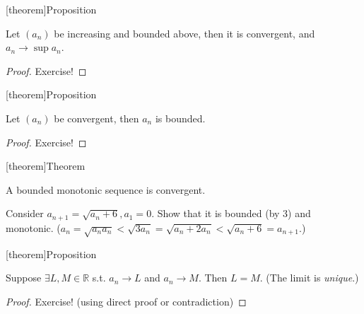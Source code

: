 \documentclass[12pt]{report}
\theoremstyle{definition}
\begin{document}
[theorem]{Proposition}
\begin{increasing and bounded above}
    Let $(a_n)$ be increasing and bounded above, then it is convergent,
    and $a_n \rightarrow{} \sup{a_n}$.
\end{increasing and bounded above}

\begin{proof}
    Exercise!
\end{proof}

[theorem]{Proposition}
\begin{convergent series is bounded}
    Let $(a_n)$ be convergent, then $a_n$ is bounded.
\end{convergent series is bounded}

\begin{proof}
    Exercise!
\end{proof}

[theorem]{Theorem}
\begin{bounded monotonic sequence is convergent}
    A bounded monotonic sequence is convergent.
\end{bounded monotonic sequence is convergent}

\begin{ex}
    Consider $a_{n + 1} = \sqrt{a_n + 6}, a_1 = 0$. 
    Show that it is bounded (by 3) and monotonic.
    ($a_n = \sqrt{a_n a_n} < \sqrt{3a_n} = \sqrt{a_n + 2a_n} < \sqrt{a_n + 6} = a_{n + 1}$.)
\end{ex}


[theorem]{Proposition}
\begin{limit of convergence is unique}
    Suppose $\exists L, M \in \mathbb{R}$ s.t. $a_n \rightarrow{}L$ and $a_n \rightarrow{}M$.
    Then $L = M$. (The limit is \emph{unique}.)
\end{limit of convergence is unique}

\begin{proof}
    Exercise! (using direct proof or contradiction)
\end{proof}
\end{document}

